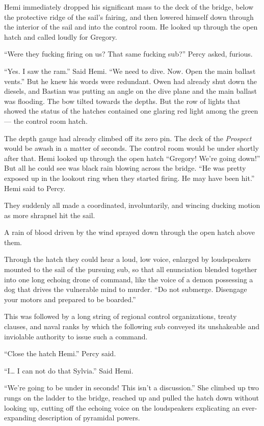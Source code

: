 \documentclass[]{scrbook}
\begin{document}
Hemi immediately dropped his significant mass to the deck of the bridge,
below the protective ridge of the sail's fairing, and then lowered
himself down through the interior of the sail and into the control room.
He looked up through the open hatch and called loudly for Gregory.

``Were they fucking firing on us? That same fucking sub?'' Percy asked,
furious.

``Yes. I saw the ram.'' Said Hemi. ``We need to dive. Now. Open the main
ballast vents.'' But he knew his words were redundant. Owen had already
shut down the diesels, and Bastian was putting an angle on the dive
plane and the main ballast was flooding. The bow tilted towards the
depths. But the row of lights that showed the status of the hatches
contained one glaring red light among the green --- the control room
hatch.

The depth gauge had already climbed off its zero pin. The deck of the
\emph{Prospect} would be awash in a matter of seconds. The control room
would be under shortly after that. Hemi looked up through the open hatch
``Gregory! We're going down!'' But all he could see was black rain
blowing across the bridge. ``He was pretty exposed up in the lookout
ring when they started firing. He may have been hit.'' Hemi said to
Percy.

They suddenly all made a coordinated, involuntarily, and wincing ducking
motion as more shrapnel hit the sail.

A rain of blood driven by the wind sprayed down through the open hatch
above them.

Through the hatch they could hear a loud, low voice, enlarged by
loudspeakers mounted to the sail of the pursuing sub, so that all
enunciation blended together into one long echoing drone of command,
like the voice of a demon possessing a dog that drives the vulnerable
mind to murder. ``Do not submerge. Disengage your motors and prepared to
be boarded.''

This was followed by a long string of regional control organizations,
treaty clauses, and naval ranks by which the following sub conveyed its
unshakeable and inviolable authority to issue such a command.

``Close the hatch Hemi.'' Percy said.

``I\ldots{} I can not do that Sylvia.'' Said Hemi.

``We're going to be under in seconds! This isn't a discussion.'' She
climbed up two rungs on the ladder to the bridge, reached up and pulled
the hatch down without looking up, cutting off the echoing voice on the
loudspeakers explicating an ever-expanding description of pyramidal
powers.
\end{document}
